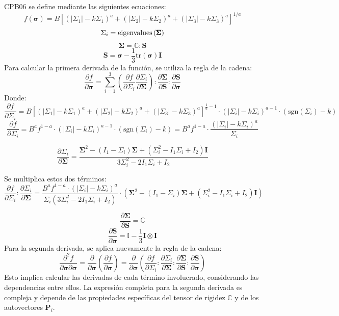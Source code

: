 \documentclass[12pt]{article}
\begin{document}
CPB06 se define mediante las siguientes ecuaciones:
\[ f(\pmb{\sigma}) = B\left[\left(\left|\Sigma_1\right| - k\Sigma_1\right)^a + \left(\left|\Sigma_2\right| - k\Sigma_2\right)^a + \left(\left|\Sigma_3\right| - k\Sigma_3\right)^a \right]^{1/a} \]
\[ \Sigma_i = \textnormal{eigenvalues}\left(\pmb{\Sigma}\right)\]
\[ \pmb{\Sigma} = \mathbb{C} : \pmb{S} \]
\[ \pmb{S} = \pmb{\sigma} - \frac{1}{3}\text{tr}(\pmb{\sigma})\pmb{I} \]
Para calcular la primera derivada de la función, se utiliza la regla de la cadena:
\[ \frac{\partial f}{\partial \pmb{\sigma}} = \sum_{i=1}^{3}\left(\frac{\partial f}{\partial \Sigma_i} \frac{\partial \Sigma_i}{\partial \pmb{\Sigma}}\right) : \frac{\partial \pmb{\Sigma}}{\partial \pmb{S}} : \frac{\partial \pmb{S}}{\partial \pmb{\sigma}} \]
Donde:
\[ \frac{\partial f}{\partial \Sigma_i} = B\left[\left(\left|\Sigma_1\right| - k\Sigma_1\right)^a + \left(\left|\Sigma_2\right| - k\Sigma_2\right)^a + \left(\left|\Sigma_3\right| - k\Sigma_3\right)^{a} \right]^{\frac{1}{a}-1} \cdot     \left(\left|\Sigma_i\right| - k\Sigma_i\right)^{a-1} \cdot \left(\text{sgn}(\Sigma_i) - k\right) \]
\[ \frac{\partial f}{\partial \Sigma_i} = B^a f^{1-a} \cdot \left(\left|\Sigma_i\right| - k\Sigma_i\right)^{a-1} \cdot \left(\text{sgn}(\Sigma_i) - k\right) =
B^a f^{1-a} \cdot \frac{\left(\left|\Sigma_i\right| - k\Sigma_i\right)^{a}}{\Sigma_i} 
\]

\[ \frac{\partial \Sigma_i}{\partial \pmb{\Sigma}} = \frac{\pmb{\Sigma}^2 - \left( I_1 - \Sigma_i\right)\pmb{\Sigma} + \left(\Sigma_i^2 - I_1\Sigma_i+I_2\right)\pmb{I}}{3\Sigma_i^2 - 2I_1\Sigma_i + I_2} \]

Se multiplica estos dos términos:
\[ \frac{\partial f}{\partial \Sigma_i} : \frac{\partial \Sigma_i}{\partial \pmb{\Sigma}} = \frac{B^a f^{1-a} \cdot \left(\left|\Sigma_i\right| - k\Sigma_i\right)^{a}}{\Sigma_i\left(3\Sigma_i^2 - 2I_1\Sigma_i + I_2\right)} \cdot \left(\pmb{\Sigma}^2 - \left( I_1 - \Sigma_i\right)\pmb{\Sigma} + \left(\Sigma_i^2 - I_1\Sigma_i+I_2\right)\pmb{I}\right) \]



\vspace*{10mm}
\[ \frac{\partial \pmb{\Sigma}}{\partial \pmb{S}} = \mathbb{C} \]
\[ \frac{\partial \pmb{S}}{\partial \pmb{\sigma}} = \mathbb{I} - \frac{1}{3}\pmb{I} \otimes \pmb{I} \]
Para la segunda derivada, se aplica nuevamente la regla de la cadena:
\[ \frac{\partial^2 f}{\partial \pmb{\sigma} \partial \pmb{\sigma}} = \frac{\partial}{\partial \pmb{\sigma}}\left(\frac{\partial f}{\partial \pmb{\sigma}}\right) = \frac{\partial}{\partial \pmb{\sigma}}\left(\frac{\partial f}{\partial \Sigma_i} : \frac{\partial \Sigma_i}{\partial \pmb{\Sigma}} : \frac{\partial \pmb{\Sigma}}{\partial \pmb{S}} : \frac{\partial \pmb{S}}{\partial \pmb{\sigma}}\right) \]
Esto implica calcular las derivadas de cada término involucrado, considerando las dependencias entre ellos. La expresión completa para la segunda derivada es compleja y depende de las propiedades específicas del tensor de rigidez \(\mathbb{C}\) y de los autovectores \(\pmb{P}_i\).
\end{document}
